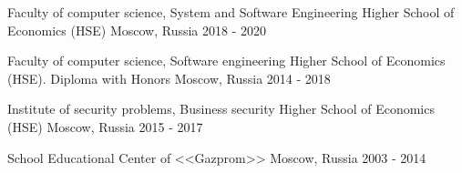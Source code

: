

\cventryeducation
{Faculty of computer science, System and Software Engineering} %
{Higher School of Economics (HSE)} %
{Moscow, Russia} %
{2018 - 2020} %

\cventryeducation
{Faculty of computer science, Software engineering} %
{Higher School of Economics (HSE). Diploma with Honors} %
{Moscow, Russia} %
{2014 - 2018} %

\cventryeducation
{Institute of security problems, Business security} %
{Higher School of Economics (HSE)} %
{Moscow, Russia} %
{2015 - 2017} %

\cventryeducation
{School} %
{Educational Center of <<Gazprom>>} %
{Moscow, Russia} %
{2003 - 2014} %


